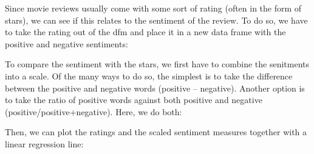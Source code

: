 \documentclass[
]{article}
\newenvironment{Shaded}{\begin{snugshade}}{\end{snugshade}}
\newcommand{\FunctionTok}[1]{\textcolor[rgb]{0.00,0.00,0.00}{#1}}
\newcommand{\NormalTok}[1]{#1}
\newcommand{\OtherTok}[1]{\textcolor[rgb]{0.56,0.35,0.01}{#1}}
\newcommand{\SpecialCharTok}[1]{\textcolor[rgb]{0.00,0.00,0.00}{#1}}
\newcommand{\StringTok}[1]{\textcolor[rgb]{0.31,0.60,0.02}{#1}}
\begin{document}
Since movie reviews usually come with some sort of rating (often in the form of stars), we can see if this relates to the sentiment of the review. To do so, we have to take the rating out of the dfm and place it in a new data frame with the positive and negative sentiments:

\begin{Shaded}
\end{Shaded}

To compare the sentiment with the stars, we first have to combine the senitments into a scale. Of the many ways to do so, the simplest is to take the difference between the positive and negative words (positive -- negative). Another option is to take the ratio of positive words against both positive and negative (positive/positive+negative). Here, we do both:

\begin{Shaded}
\end{Shaded}

Then, we can plot the ratings and the scaled sentiment measures together with a linear regression line:
\end{document}
